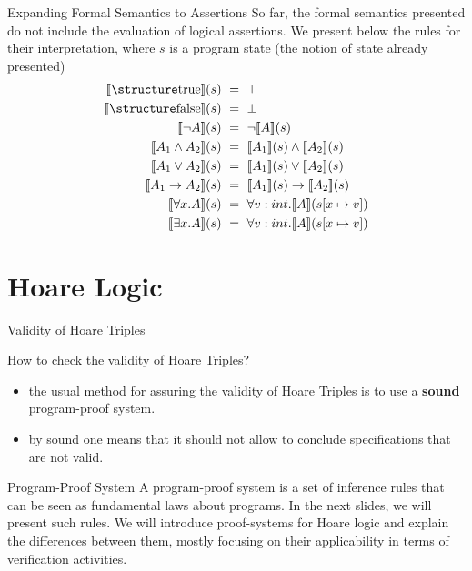 \documentclass[aspectratio=169]{beamer}
\begin{document}
\begin{slide}{Expanding Formal Semantics to Assertions}
  So far, the formal semantics presented do not include the evaluation of logical assertions. We present below the rules for their interpretation, where $s$ is a program state (the notion of state already presented)
  \begin{align*}
  \llbracket \kw{true} \rrbracket(s) &~=~  \top\\
  \llbracket \kw{false} \rrbracket(s) &~=~ \bot\\
  \llbracket \neg A\rrbracket(s) &~=~ \neg \llbracket A \rrbracket(s) \\
  \llbracket A_1 \land A_2\rrbracket(s) &~=~ \llbracket A_1 \rrbracket(s) \land \llbracket A_2\rrbracket(s)\\
  \llbracket A_1 \lor A_2\rrbracket(s) &~=~ \llbracket A_1 \rrbracket(s) \lor \llbracket A_2\rrbracket(s)\\
  \llbracket A_1 \to A_2\rrbracket(s) &~=~ \llbracket A_1 \rrbracket(s) \to \llbracket A_2\rrbracket(s)\\
  \llbracket \forall x. A\rrbracket(s) &~=~ \forall v:int. \llbracket A\rrbracket(s[x \mapsto v])\\
  \llbracket \exists x. A\rrbracket(s) &~=~ \forall v:int. \llbracket A\rrbracket(s[x \mapsto v])\\
  \end{align*}
  
\end{slide}



\section*{Hoare Logic}

\begin{slide}{Validity of Hoare Triples}
\begin{block}{How to check the validity of Hoare Triples?}
  \begin{itemize}
    \item the usual method for assuring the validity of Hoare Triples is to use a {\bf sound}
program-proof system. 
  \item by sound one means that it should not allow to conclude specifications that are not valid. 
  \end{itemize}
\end{block}
\begin{block}{Program-Proof System}
  A program-proof system is a set of inference rules that can be seen as fundamental laws about programs. In the next slides, we will present such rules. We will introduce proof-systems for Hoare logic and explain the differences between them, mostly focusing on their applicability in terms of verification activities.
\end{block}  
\end{slide}
\end{document}
